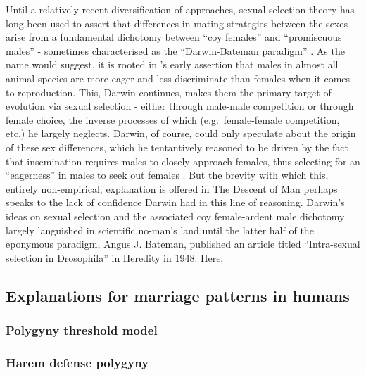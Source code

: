 \documentclass[]{article}
\begin{document}
Until a relatively recent diversification of approaches, sexual
selection theory has long been used to assert that differences in mating
strategies between the sexes arise from a fundamental dichotomy between
``coy females'' and ``promiscuous males'' - sometimes characterised as
the ``Darwin-Bateman paradigm'' \citep{borgerhoffmulder2021}. As the
name would suggest, it is rooted in \citet{darwin1981} 's early
assertion that males in almost all animal species are more eager and
less discriminate than females when it comes to reproduction. This,
Darwin continues, makes them the primary target of evolution via sexual
selection - either through male-male competition or through female
choice, the inverse processes of which (e.g.~female-female competition,
etc.) he largely neglects. Darwin, of course, could only speculate about
the origin of these sex differences, which he tentantively reasoned to
be driven by the fact that insemination requires males to closely
approach females, thus selecting for an ``eagerness'' in males to seek
out females \citep{darwin1981}. But the brevity with which this,
entirely non-empirical, explanation is offered in The Descent of Man
perhaps speaks to the lack of confidence Darwin had in this line of
reasoning. Darwin's ideas on sexual selection and the associated coy
female-ardent male dichotomy largely languished in scientific no-man's
land until the latter half of the eponymous paradigm, Angus J. Bateman,
published an article titled ``Intra-sexual selection in Drosophila'' in
Heredity in 1948. Here, \citet{bateman1948}

\hypertarget{explanations-for-marriage-patterns-in-humans}{%
\subsection{Explanations for marriage patterns in
humans}\label{explanations-for-marriage-patterns-in-humans}}

\hypertarget{polygyny-threshold-model}{%
\subsubsection{Polygyny threshold
model}\label{polygyny-threshold-model}}

\hypertarget{harem-defense-polygyny}{%
\subsubsection{Harem defense polygyny}\label{harem-defense-polygyny}}
\end{document}
